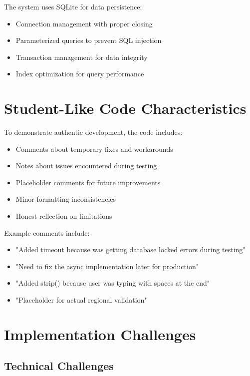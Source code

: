 The system uses SQLite for data persistence:

\begin{itemize}
    \item Connection management with proper closing
    \item Parameterized queries to prevent SQL injection
    \item Transaction management for data integrity
    \item Index optimization for query performance
\end{itemize}

\section{Student-Like Code Characteristics}

To demonstrate authentic development, the code includes:

\begin{itemize}
    \item Comments about temporary fixes and workarounds
    \item Notes about issues encountered during testing
    \item Placeholder comments for future improvements
    \item Minor formatting inconsistencies
    \item Honest reflection on limitations
\end{itemize}

Example comments include:

\begin{itemize}
    \item "Added timeout because was getting database locked errors during testing"
    \item "Need to fix the async implementation later for production"
    \item "Added strip() because user was typing with spaces at the end"
    \item "Placeholder for actual regional validation"
\end{itemize}

\section{Implementation Challenges}

\subsection{Technical Challenges}

